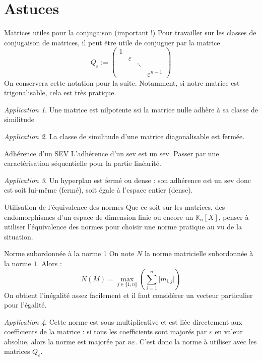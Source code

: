 \documentclass[french]{book}
\newcommand{\K}{\mathbb{K}}
\theoremstyle{plain}
\theoremstyle{definition}
\theoremstyle{remark}
\newtheorem*{app}{Application}
\begin{document}
\section{Astuces}
\begin{AS}{Matrices utiles pour la conjugaison (important !)} Pour travailler sur les classes de conjugaison de matrices, il peut être utile de conjuguer par la matrice $$Q_\varepsilon:=\begin{pmatrix}
	1&&& \\
	&\varepsilon&& \\
	&&\ddots& \\
	&&&\varepsilon^{n-1}
\end{pmatrix}$$ On conservera cette notation pour la suite. Notamment, si notre matrice est trigonalisable, cela est très pratique.
\end{AS} \begin{app} Une matrice est nilpotente ssi la matrice nulle adhère à sa classe de similitude \end{app}
\begin{app} La classe de similitude d'une matrice diagonalisable est fermée.
\end{app}
\begin{AS}{Adhérence d'un SEV} L'adhérence d'un sev est un sev. Passer par une caractérisation séquentielle pour la partie linéarité.
\end{AS}
\begin{app} Un hyperplan est fermé ou dense : son adhérence est un sev donc est soit lui-même (fermé), soit égale à l'espace entier (dense).\end{app}
\begin{AS}{Utilisation de l'équivalence des normes} Que ce soit sur les matrices, des endomorphismes d'un espace de dimension finie ou encore un $\K_n[X]$, penser à utiliser l'équivalence des normes pour choisir une norme pratique au vu de la situation.
\end{AS}
\begin{AS}{Norme subordonnée à la norme 1} On note $N$ la norme matricielle subordonnée à la norme $1$. Alors : $$N(M)=\max_{j\in\llbracket1,n\rrbracket}\left(\sum_{i=1}^{n}\lvert m_{i,j}\rvert\right)$$ On obtient l'inégalité assez facilement et il faut considérer un vecteur particulier pour l'égalité.
\end{AS}
\begin{app}
	Cette norme est sous-multiplicative et est liée directement aux coefficients de la matrice : si tous les coefficients sont majorés par $\varepsilon$ en valeur absolue, alors la norme est majorée par $n\varepsilon$. C'est donc la norme à utiliser avec les matrices $Q_\varepsilon$.
\end{app}
\end{document}
